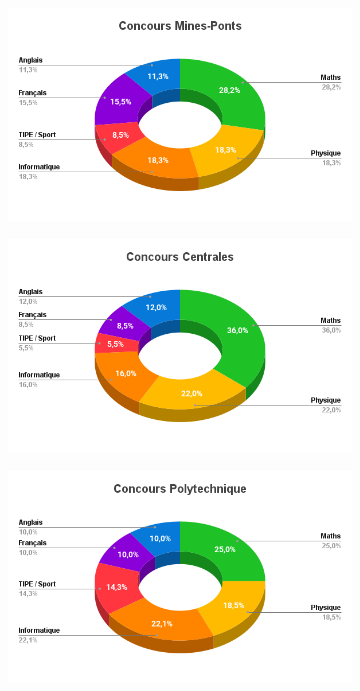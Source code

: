 \documentclass[aspectratio=169]{beamer}
\begin{document}
\begin{frame}
    \begin{figure}[h]
        \begin{subfigure}{0.49\textwidth}
            \includegraphics[width=0.95\linewidth]{ressource_diapo/Mines-Ponts.png}
        \end{subfigure}
        \begin{subfigure}{0.49\textwidth}
            \includegraphics[width=0.95\linewidth]{ressource_diapo/Centrales.png}
        \end{subfigure}
        \begin{subfigure}{0.49\textwidth}
            \includegraphics[width=0.95\linewidth]{ressource_diapo/X.png}

\end{subfigure}
\end{figure}
\end{frame}
\end{document}
